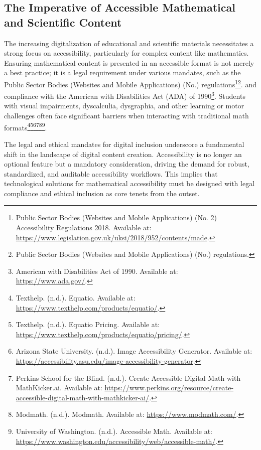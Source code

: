 \subsection{The Imperative of Accessible Mathematical and Scientific Content}
The increasing digitalization of educational and scientific materials necessitates a strong focus on accessibility, particularly for complex content like mathematics. Ensuring mathematical content is presented in an accessible format is not merely a best practice; it is a legal requirement under various mandates, such as the Public Sector Bodies (Websites and Mobile Applications) (No.) regulations\footnote{Public Sector Bodies (Websites and Mobile Applications) (No. 2) Accessibility Regulations 2018. Available at: \url{https://www.legislation.gov.uk/uksi/2018/952/contents/made}.}\footnote{Public Sector Bodies (Websites and Mobile Applications) (No.) regulations.}. and compliance with the American with Disabilities Act (ADA) of 1990\footnote{American with Disabilities Act of 1990. Available at: \url{https://www.ada.gov/}.}. Students with visual impairments, dyscalculia, dysgraphia, and other learning or motor challenges often face significant barriers when interacting with traditional math formats\footnote{Texthelp. (n.d.). Equatio. Available at: \url{https://www.texthelp.com/products/equatio/}.}\footnote{Texthelp. (n.d.). Equatio Pricing. Available at: \url{https://www.texthelp.com/products/equatio/pricing/}.}\footnote{Arizona State University. (n.d.). Image Accessibility Generator. Available at: \url{https://accessibility.asu.edu/image-accessibility-generator}.}\footnote{Perkins School for the Blind. (n.d.). Create Accessible Digital Math with MathKicker.ai. Available at: \url{https://www.perkins.org/resource/create-accessible-digital-math-with-mathkicker-ai/}.}\footnote{Modmath. (n.d.). Modmath. Available at: \url{https://www.modmath.com/}.}\footnote{University of Washington. (n.d.). Accessible Math. Available at: \url{https://www.washington.edu/accessibility/web/accessible-math/}.}.

The legal and ethical mandates for digital inclusion underscore a fundamental shift in the landscape of digital content creation. Accessibility is no longer an optional feature but a mandatory consideration, driving the demand for robust, standardized, and auditable accessibility workflows. This implies that technological solutions for mathematical accessibility must be designed with legal compliance and ethical inclusion as core tenets from the outset.


